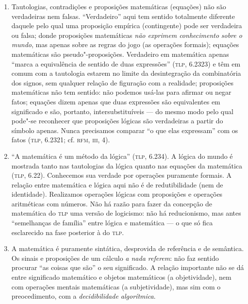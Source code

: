 {\begin{enumerate}
\item Tautologias, contradições e proposições matemáticas (equações)
não são verdadeiras nem falsas. ``Verdadeiro'' aqui tem sentido
totalmente diferente daquele pelo qual uma proposição empírica
(contingente) pode ser verdadeira ou falsa; donde proposições
matemáticas \emph{não exprimem conhecimento} \emph{sobre o
mundo}, mas apenas sobre as regras do jogo (as operações
formais); equações matemáticas são pseudo"-proposições.
Verdadeiro em matemática apenas “marca a equivalência de sentido
de duas expressões” (\textsc{tlp}, 6.2323) e têm em comum com a
tautologia estarem no limite da desintegração da combinatória
dos signos, sem qualquer relação de figuração com a realidade;
proposições matemáticas não tem sentido: não podemos usá-las
para afirmar ou negar fatos; equações dizem apenas que duas
expressões são equivalentes em significado e são, portanto,
intersubstituíveis --- do mesmo modo pelo qual pode"-se reconhecer
que proposições lógicas são verdadeiras a partir do símbolo
apenas. Nunca precisamos comparar “o que elas expressam” com os
fatos (\textsc{tlp}, 6.2321; cf. \textsc{rfm}, \textsc{iii}, 4).

\item “A matemática é um método da lógica” (\textsc{tlp}, 6.234). A lógica do
mundo é mostrada tanto nas tautologias da lógica quanto nas
equações da matemática (\textsc{tlp}, 6.22). Conhecemos sua verdade por
operações puramente formais. A relação entre matemática e lógica
aqui não é de redutibilidade (nem de identidade). Realizamos
operações lógicas com proposições e operações aritméticas com
números. Não há razão para fazer da concepção de matemática do
\textsc{tlp} uma versão de logicismo: não há reducionismo, mas antes
``semelhanças de família'' entre lógica e matemática --- o que só
fica esclarecido na fase posterior à do \textsc{tlp}.

\item A matemática é puramente sintática, desprovida de referência e
de semântica. Os sinais e proposições de um cálculo \emph{a
nada referem}: não faz sentido procurar ``as
coisas que são'' o seu significado. A relação
importante não se dá entre significado matemático e objetos
matemáticos (a objetividade), nem com operações mentais
matemáticas (a subjetividade), mas sim com o preocedimento, com
a \emph{decidibilidade algorítmica}.


\end{enumerate}}
